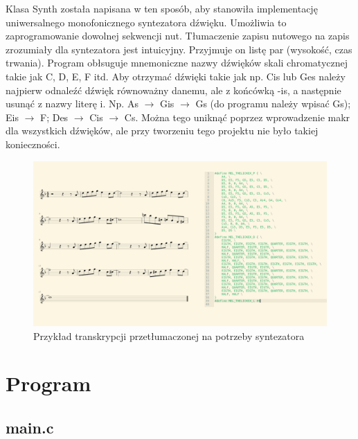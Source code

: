 \documentclass[fleqn]{article}
\begin{document}
Klasa Synth została napisana w ten sposób, aby stanowiła implementację uniwersalnego monofonicznego syntezatora dźwięku. Umożliwia to zaprogramowanie dowolnej sekwencji nut. Tłumaczenie zapisu nutowego na zapis zrozumiały dla syntezatora jest intuicyjny. Przyjmuje on listę par (wysokość, czas trwania). Program obłsuguje mnemoniczne nazwy dźwięków skali chromatycznej takie jak C, D, E, F itd. Aby otrzymać dźwięki takie jak np. Cis lub Ges należy najpierw odnaleźć dźwięk równoważny danemu, ale z końcówką -is, a następnie usunąć z nazwy literę i. Np. As $\rightarrow$ Gis $\rightarrow$ Gs (do programu należy wpisać Gs); Eis $\rightarrow$ F; Des $\rightarrow$ Cis $\rightarrow$ Cs. Można tego uniknąć poprzez wprowadzenie makr dla wszystkich dźwięków, ale przy tworzeniu tego projektu nie było takiej konieczności.

\begin{figure}[H]
	\centering
	\includegraphics[width=\textwidth]{assets/synthdata.png}
	\caption{Przykład transkrypcji przetłumaczonej na potrzeby syntezatora}
\end{figure}

\section{Program}
\subsection{main.c}

\begin{minipage}[t]{.45\textwidth}
	
\end{minipage}\hfill
\noindent\begin{minipage}[t]{.45\textwidth}
	
\end{minipage}\hfill
\end{document}
